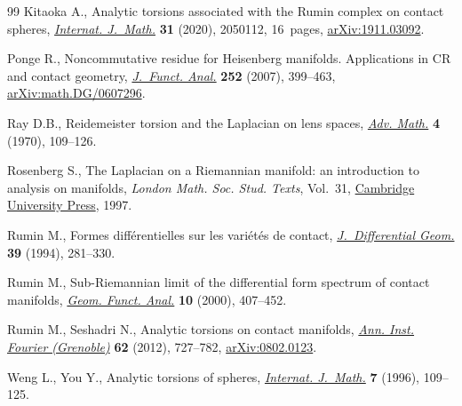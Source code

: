 \documentclass[10pt,a4paper]{amsart}
\numberwithin{equation}{section}
\begin{document}
\begin{thebibliography}{99}
Kitaoka A., Analytic torsions associated with the {R}umin complex on contact
 spheres, \href{https://doi.org/10.1142/S0129167X20501128}{\textit{Internat. J.~Math.}} \textbf{31} (2020), 2050112, 16~pages,
 \href{http://arxiv.org/abs/1911.03092}{arXiv:1911.03092}.

Ponge R., Noncommutative residue for {H}eisenberg manifolds. {A}pplications in
 {CR} and contact geometry, \href{https://doi.org/10.1016/j.jfa.2007.07.001}{\textit{J.~Funct. Anal.}} \textbf{252} (2007),
 399--463, \href{http://arxiv.org/abs/math.DG/0607296}{arXiv:math.DG/0607296}.

Ray D.B., Reidemeister torsion and the {L}aplacian on lens spaces, \href{https://doi.org/10.1016/0001-8708(70)90018-6}{\textit{Adv.
 Math.}} \textbf{4} (1970), 109--126.

Rosenberg S., The Laplacian on a Riemannian manifold: an introduction to
 analysis on manifolds, \textit{London Math. Soc. Stud. Texts}, Vol.~31,
 \href{https://doi.org/10.1017/CBO9780511623783}{Cambridge University Press}, 1997.

Rumin M., Formes diff\'erentielles sur les vari\'et\'es de contact,
 \href{https://doi.org/10.4310/jdg/1214454873}{\textit{J.~Differential Geom.}} \textbf{39} (1994), 281--330.

Rumin M., Sub-{R}iemannian limit of the differential form spectrum of contact
 manifolds, \href{https://doi.org/10.1007/s000390050013}{\textit{Geom. Funct. Anal.}} \textbf{10} (2000), 407--452.

Rumin M., Seshadri N., Analytic torsions on contact manifolds, \href{https://doi.org/10.5802/aif.2693}{\textit{Ann.
 Inst. Fourier (Grenoble)}} \textbf{62} (2012), 727--782, \href{http://arxiv.org/abs/0802.0123}{arXiv:0802.0123}.

Weng L., You Y., Analytic torsions of spheres, \href{https://doi.org/10.1142/S0129167X96000074}{\textit{Internat. J.~Math.}}
 \textbf{7} (1996), 109--125.

\end{thebibliography}
\end{document}
